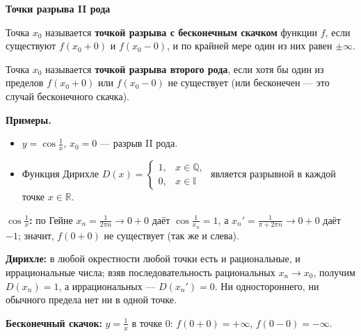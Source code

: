 \documentclass[a4paper,11pt]{article}
\newcommand{\R}{\mathbb{R}}
\newcommand{\podr}[1]{\par\needspace{8\baselineskip}\medskip
  {\large\bfseries\textcolor{oprc!80!black}{#1}}\par\nopagebreak\smallskip}
\begin{document}
\begin{center}
\end{center}

\podr{Точки разрыва II рода}

\begin{opr}
Точка $x_0$ называется \textbf{точкой разрыва с бесконечным скачком} функции $f$, если существуют $f(x_0 + 0)$ и $f(x_0 - 0)$,
и по крайней мере один из них равен $\pm\infty$.
\end{opr}

\begin{opr}
Точка $x_0$ называется \textbf{точкой разрыва второго рода}, если хотя бы один из пределов $f(x_0 + 0)$ или $f(x_0 - 0)$
не существует (или бесконечен --- это случай бесконечного скачка).
\end{opr}

\textbf{Примеры.}
\begin{itemize}[leftmargin=*]
  \item $y = \cos\frac1x$, $x_0 = 0$ --- разрыв II рода.
  \item Функция Дирихле $D(x) = \begin{cases} 1, & x \in \mathbb{Q},\\ 0, & x \in \mathbb{I} \end{cases}$
        является разрывной в каждой точке $x \in \R$.
\end{itemize}

\begin{dop}
\textbf{$\cos\frac1x$:} по Гейне $x_n = \frac{1}{2\pi n} \to 0 + 0$ даёт $\cos\frac1{x_n} = 1$, а $x_n' = \frac{1}{\pi + 2\pi n} \to 0 + 0$
даёт $-1$; значит, $f(0 + 0)$ не существует (так же и слева).

\textbf{Дирихле:} в любой окрестности любой точки есть и рациональные, и иррациональные числа; взяв последовательность рациональных
$x_n \to x_0$, получим $D(x_n) = 1$, а иррациональных --- $D(x_n') = 0$. Ни одностороннего, ни обычного предела нет ни в одной точке.

\textbf{Бесконечный скачок:} $y = \frac1x$ в точке $0$: $f(0 + 0) = +\infty$, $f(0 - 0) = -\infty$.
\end{dop}
\end{document}
